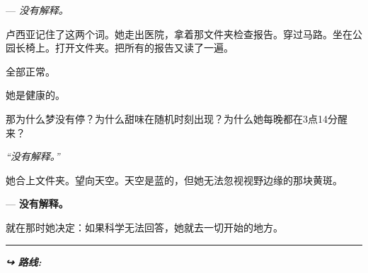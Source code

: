 \noindent --- \textit{没有解释。}

\noindent 卢西亚记住了这两个词。她走出医院，拿着那文件夹检查报告。穿过马路。坐在公园长椅上。打开文件夹。把所有的报告又读了一遍。

\noindent 全部正常。

\noindent 她是健康的。

\noindent 那为什么梦没有停？为什么甜味在随机时刻出现？为什么她每晚都在3点14分醒来？

\noindent \textit{\textquotedblleft{}没有解释。\textquotedblright{}}

\noindent 她合上文件夹。望向天空。天空是蓝的，但她无法忽视视野边缘的那块黄斑。

\noindent --- \textbf{没有解释。}

\noindent 就在那时她决定：如果科学无法回答，她就去一切开始的地方。

\vspace{0.5em}\noindent\rule{\textwidth}{0.5pt}\vspace{0.5em}

\vspace{0.5em}
\noindent\textit{\textbf{↪ 路线:}  \rotasep {}}
